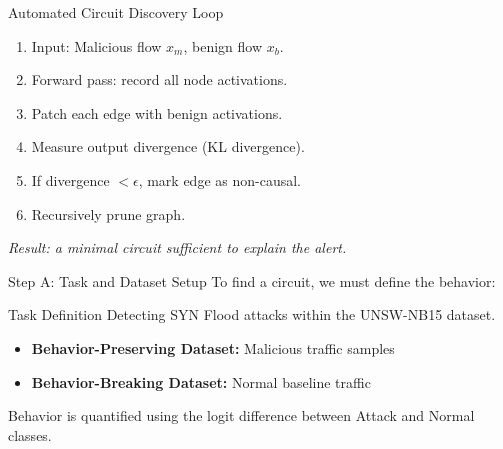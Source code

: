 \documentclass{beamer}
\begin{document}
	\begin{frame}{Automated Circuit Discovery Loop}
		\begin{enumerate}
			\item Input: Malicious flow $x_m$, benign flow $x_b$.
			\item Forward pass: record all node activations.
			\item Patch each edge with benign activations.
			\item Measure output divergence (KL divergence).
			\item If divergence $< \epsilon$, mark edge as non-causal.
			\item Recursively prune graph.
		\end{enumerate}
		\vspace{0.2cm}
		\centering
		\textit{Result: a minimal circuit sufficient to explain the alert.}
	\end{frame}
	
	\begin{frame}{Step A: Task and Dataset Setup}
		To find a circuit, we must define the behavior:
		\vspace{0.5cm}
		\begin{block}{Task Definition}
			Detecting SYN Flood attacks within the UNSW-NB15 dataset.
		\end{block}
		\vspace{0.5cm}
		\begin{itemize}
			\item \textbf{Behavior-Preserving Dataset:} Malicious traffic samples
			
			\item \textbf{	Behavior-Breaking Dataset:} Normal baseline traffic
		\end{itemize}
		\vspace{0.25cm}
		\justifying Behavior is quantified using the logit difference between Attack and Normal classes.
	\end{frame}
	
\end{document}
